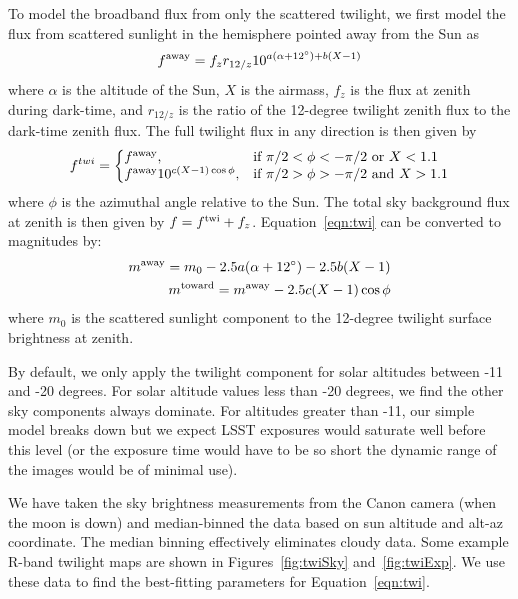 \documentclass[]{spie}
\begin{document}
To model the broadband flux from only the scattered twilight, we first model the flux from scattered sunlight in the hemisphere pointed away from the Sun as
\begin{equation}\label{eqn:twi1}
  f^{\rm{away}} = f_{z} r_{12/z} 10^{a(\alpha+12^{\circ})+b(X-1)}
\end{equation}
where $\alpha$ is the altitude of the Sun, $X$ is the airmass, $f_{z}$ is the flux at zenith during dark-time, and $r_{12/z}$ is the ratio of the 12-degree twilight zenith flux to the dark-time zenith flux. The full twilight flux in any direction is then given by
\begin{equation}
  \label{eqn:twi}
  f^{twi}  = \left\{
  \begin{array}{@{}ll@{}}
        f^{\rm{away}}, & \text{if}\  \pi/2 < \phi < -\pi/2  \text{ or } X < 1.1\\
        f^{\rm{away}} 10^{c (X-1) \cos{\phi}}, &  \text{if}\   \pi/2 > \phi >  -\pi/2 \text{ and } X > 1.1
        \end{array} \right.
\end{equation}
where $\phi$ is the azimuthal angle relative to the Sun. The total sky background flux at zenith is then given by $f = f^{\rm{twi}} + f_{z}$. Equation~\ref{eqn:twi} can be converted to magnitudes by:
\begin{eqnarray}
  m^{\rm{away}} = m_0 -2.5a(\alpha+12^{\circ})-2.5b(X-1) \\
  m^{\rm{toward}} = m^{\rm{away}} -2.5c(X-1)\cos{\phi}
\end{eqnarray}
where $m_0$ is the scattered sunlight component to the 12-degree twilight surface brightness at zenith.  

By default, we only apply the twilight component for solar altitudes between -11 and -20 degrees. For solar altitude values less than -20 degrees, we find the other sky components always dominate. For altitudes greater than -11, our simple model breaks down but we expect LSST exposures would saturate well before this level (or the exposure time would have to be so short the dynamic range of the images would be of minimal use).  

We have taken the sky brightness measurements from the Canon camera (when the moon is down) and median-binned the data based on sun altitude and alt-az coordinate.  The median binning effectively eliminates cloudy data.  Some example R-band twilight maps are shown in Figures~\ref{fig:twiSky} and~\ref{fig:twiExp}.  We use these data to find the best-fitting parameters for Equation~\ref{eqn:twi}.  
\end{document}

